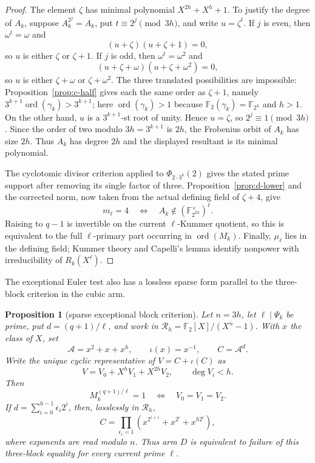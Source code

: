 \documentclass[11pt]{article}
\newtheorem{proposition}[theorem]{Proposition}
\theoremstyle{definition}
\theoremstyle{remark}
\begin{document}
\begin{proof}
The element $\zeta$ has minimal polynomial $X^{2h}+X^h+1$.  To justify the
degree of $A_k$, suppose $A_k^{2^j}=A_k$, put
$t\equiv2^j\pmod{3h}$, and write $u=\zeta^t$.  If $j$ is even, then
$\omega^t=\omega$ and
\[
 (u+\zeta)(u+\zeta+1)=0,
\]
so $u$ is either $\zeta$ or $\zeta+1$.  If $j$ is odd, then
$\omega^t=\omega^2$ and
\[
 (u+\zeta+\omega)(u+\zeta+\omega^2)=0,
\]
so $u$ is either $\zeta+\omega$ or $\zeta+\omega^2$.  The three translated
possibilities are impossible: Proposition~\ref{prop:c-half} gives each the
same order as $\zeta+1$, namely
$3^{k+1}\operatorname{ord}(\gamma_k)>3^{k+1}$; here
$\operatorname{ord}(\gamma_k)>1$ because
$\mathbb F_2(\gamma_k)=\mathbb F_{2^h}$ and $h>1$.  On the other hand, $u$ is a
$3^{k+1}$-st root of unity.  Hence $u=\zeta$, so
$2^j\equiv1\pmod{3h}$.  Since the order of two modulo $3h=3^{k+1}$ is
$2h$, the Frobenius orbit of $A_k$ has size $2h$.  Thus $A_k$ has degree
$2h$ and the displayed resultant is its minimal polynomial.

The cyclotomic divisor criterion applied to
$\Phi_{2\cdot3^k}(2)$ gives the stated prime support after removing its
single factor of three.  Proposition~\ref{prop:d-lower} and the corrected
norm, now taken from the actual defining field of $\zeta+4$, give
\[
 m_\ell=4
 \quad\Longleftrightarrow\quad
 A_k\notin(\mathbb F_{2^{2h}}^{\times})^\ell.
\]
Raising to $q-1$ is invertible on the current $\ell$-Kummer quotient, so
this is equivalent to the full $\ell$-primary part occurring in
$\operatorname{ord}(M_k)$.  Finally, $\mu_\ell$ lies in the defining field;
Kummer theory and Capelli's lemma identify nonpower with irreducibility of
$R_k(X^\ell)$.
\end{proof}

The exceptional Euler test also has a lossless sparse form parallel to the
three-block criterion in the cubic arm.

\begin{proposition}[sparse exceptional block criterion]
\label{prop:d-block}
Let $n=3h$, let $\ell\mid\Psi_k$ be prime, put
$d=(q+1)/\ell$, and work in
$\mathcal R_h=\mathbb F_2[X]/(X^n-1)$.  With $x$ the class of $X$, set
\[
 \mathcal A=x^2+x+x^h,\qquad
 \iota(x)=x^{-1},\qquad C=\mathcal A^d.
\]
Write the unique cyclic representative of $V=C+\iota(C)$ as
\[
 V=V_0+X^hV_1+X^{2h}V_2,
 \qquad \deg V_i<h.
\]
Then
\[
 M_k^{(q+1)/\ell}=1
 \quad\Longleftrightarrow\quad
 V_0=V_1=V_2.
\]
If $d=\sum_{i=0}^{h-1}\epsilon_i2^i$, then, losslessly in
$\mathcal R_h$,
\[
 C=\prod_{\epsilon_i=1}
 \left(x^{2^{i+1}}+x^{2^i}+x^{h2^i}\right),
\]
where exponents are read modulo $n$.  Thus arm $D$ is equivalent to failure
of this three-block equality for every current prime $\ell$.
\end{proposition}
\end{document}
